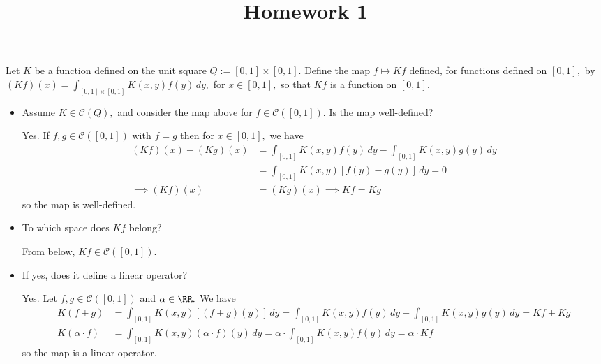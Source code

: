 \documentclass{article}
\begin{document}
\title{Homework 1}
\maketitle
\thispagestyle{fancy}

Let $K$ be a function defined on the unit square $Q:=[0, 1]\times[0, 1].$ Define the map $f\mapsto Kf$ defined, for functions defined on $[0, 1],$ by $(Kf)(x)=\int_{[0, 1]\times[0, 1]} K(x, y) f(y)\, dy,$ for $x\in[0, 1],$ so that $Kf$ is a function on $[0, 1].$
\begin{itemize}
	\item Assume $K\in \mathcal{C}(Q),$ and consider the map above for $f\in \mathcal{C}([0, 1]).$ Is the map well-defined?
		\begin{answer*}
			Yes. If $f, g\in \mathcal{C}([0, 1])$ with $f=g$ then for $x\in[0, 1],$ we have
			\begin{align*}
				(Kf)(x)-(Kg)(x) &= \int_{[0, 1]} K(x, y)f(y)\, dy - \int_{[0, 1]} K(x, y)g(y)\, dy \\
				&= \int_{[0, 1]} K(x, y) \left[ f(y)-g(y) \right]\, dy = 0 \\
				\implies (Kf)(x) &= (Kg)(x) \implies Kf=Kg
			\end{align*}
			so the map is well-defined.
		\end{answer*}

	\item To which space does $Kf$ belong?
		\begin{answer*}
			From below, $Kf\in\mathcal C([0, 1]).$
		\end{answer*}

	\item If yes, does it define a linear operator?
		\begin{answer*}
			Yes. Let $f, g\in\mathcal C([0, 1])$ and $\alpha\in\RR.$ We have
			\begin{align*}
				K(f+g) &= \int_{[0, 1]} K(x, y)\left[ (f+g)(y) \right]\, dy = \int_{[0, 1]} K(x, y) f(y)\, dy + \int_{[0, 1]} K(x, y) g(y)\, dy = Kf + Kg \\
				K(\alpha\cdot f) &= \int_{[0, 1]} K(x, y) (\alpha\cdot f)(y)\, dy = \alpha\cdot\int_{[0, 1]} K(x, y) f(y)\, dy = \alpha \cdot Kf
			\end{align*}
			so the map is a linear operator.
		\end{answer*}


\end{itemize}
\end{document}

